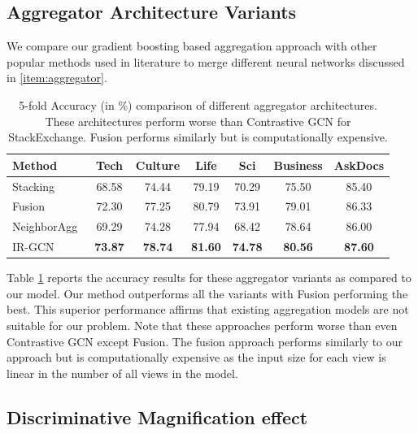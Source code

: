 \subsection{Aggregator Architecture Variants}
\label{sec:agg}
We compare our gradient boosting based aggregation approach with other popular methods used in literature to merge different neural networks discussed in \cref{item:aggregator}.
\begin{table}[h]
  \centering
  \robustify\bfseries
  \begin{tabular}{l | c | c| c| c|c|c}
    \toprule
    {Method} &
    {Tech} &
    {Culture} &
    {Life} &
    {Sci}&
    {Business} & {AskDocs}\\
      \midrule
    Stacking~\cite{Stacking} &68.58 & 74.44 & 79.19 & 70.29 &75.50 & 85.40 \\
    Fusion~\cite{Fusion18}  &72.30 &77.25 & 80.79 & 73.91 &79.01 & 86.33\\
    NeighborAgg~\cite{graphsage, relationalGCN}  &69.29 &74.28 & 77.94 & 68.42 &78.64 & 86.00  \\
    IR-GCN & \bfseries 73.87 & \bfseries 78.74 & \bfseries 81.60&  \bfseries74.78&  \bfseries80.56 & \bfseries 87.60\\
    \bottomrule
  \end{tabular}
  \caption{\label{tab:agg} 5-fold Accuracy (in \%) comparison of different aggregator architectures. These architectures perform worse than Contrastive GCN for StackExchange. Fusion performs similarly but is computationally expensive.}
\end{table}

Table \ref{tab:agg} reports the accuracy results for these aggregator variants as compared to our model. Our method outperforms all the variants with Fusion performing the best.  This superior performance affirms that existing aggregation models are not suitable for our problem. Note that these approaches perform worse than even Contrastive GCN except Fusion. The fusion approach performs similarly to our approach but is computationally expensive as the input size for each view is linear in the number of all views in the model.

\subsection{Discriminative Magnification effect}

